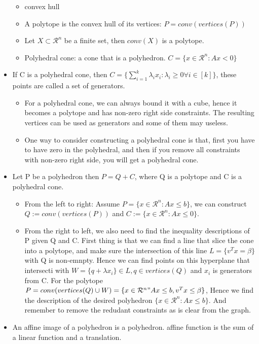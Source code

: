 \documentclass{article}
\begin{document}
\begin{itemize}
\begin{itemize}
\item convex hull
\item A polytope is the convex hull of its vertices: $P = conv(vertices(P))$
\item Let $X\subset \mathcal{R}^n$ be a finite set, then $conv(X)$ is a polytope.
\item Polyhedral cone: a cone that is a polyhedron. $C = \{x\in \mathcal{R}^n:Ax<0\}$
\end{itemize}
\item If C is a polyhedral cone, then $C = \{\sum_{i=1}^k \lambda_ix_i:\lambda_i\geq 0\forall i\in [k]\}$, these points are called a set of generators.
\begin{itemize}
\item For a polyhedral cone, we can always bound it with a cube, hence it becomes a polytope and has non-zero right side constraints. The resulting vertices can be used as generators and some of them may useless.
\item One way to consider constructing a polyhedral cone is that, first you have to have zero in the polyhedral, and then if you remove all constraints with non-zero right side, you will get a polyhedral cone.
\end{itemize}
\item Let P be a polyhedron then $P = Q+C$, where Q is a polytope and C is a polyhedral cone.
\begin{itemize}
\item From the left to right: Assume $P = \{x\in\mathcal{R}^n: Ax\leq b\}$, we can construct $Q :=conv(vertices(P))$ and $C:=\{x\in\mathcal{R}^n:Ax\leq 0\}$.
\item From the right to left, we also need to find the inequality descriptions of P given Q and C. First thing is that we can find a line that slice the cone into a polytope, and make sure the intersection of this line $ L = \{v^Tx=\beta\}$with Q is non-emnpty. Hence we can find points on this hyperplane that intersecti with $W = \{q+\lambda x_i\}\in L, q\in vertices(Q)$ and $x_i$ is generators from C. For the polytope $P = conv(vertices(Q)\cup W)=\{x\in \mathcal{R}^n" Ax\leq b, v^Tx\leq \beta\}$, Hence we find the description of the desired polyhedron $\{x\in \mathcal{R}^n: Ax\leq b\}$. And remember to remove the redudant constraints as is clear from the graph.
\end{itemize}
\item An affine image of a polyhedron is a polyhedron. affine function is the sum of a linear function and a translation.

\end{itemize}
\end{document}
